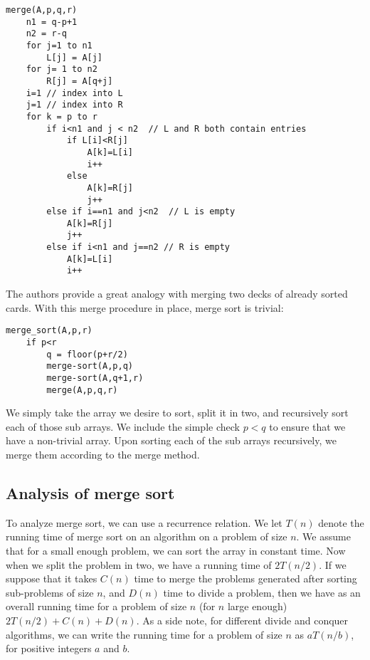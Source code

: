 \documentclass[12pt,english]{article}
\begin{document}
\begin{lstlisting}
merge(A,p,q,r)
	n1 = q-p+1
	n2 = r-q
	for j=1 to n1
		L[j] = A[j]
	for j= 1 to n2
		R[j] = A[q+j]
	i=1 // index into L
	j=1 // index into R
	for k = p to r
		if i<n1 and j < n2  // L and R both contain entries
			if L[i]<R[j] 
				A[k]=L[i]
				i++
			else
				A[k]=R[j]
				j++
		else if i==n1 and j<n2  // L is empty
			A[k]=R[j]
			j++
		else if i<n1 and j==n2 // R is empty
			A[k]=L[i]
			i++
\end{lstlisting}

The authors \cite{CoStRiLe:2001} provide a great analogy with merging two decks of already sorted cards.  With this merge procedure in place, merge sort is trivial:

\begin{lstlisting}
merge_sort(A,p,r)
	if p<r
		q = floor(p+r/2)
		merge-sort(A,p,q)
		merge-sort(A,q+1,r)
		merge(A,p,q,r)
\end{lstlisting}

We simply take the array we desire to sort, split it in two, and recursively sort each of those sub arrays.  We include the simple check $p<q$ to ensure that we have a non-trivial array. Upon sorting each of the sub arrays recursively, we merge them according to the merge method.  

\subsection{Analysis of merge sort}

To analyze merge sort, we can use a recurrence relation.  We let $T(n)$ denote the running time of merge sort on an algorithm on a problem of size $n$.  We assume that for a small enough problem, we can sort the array in constant time.   Now when we split the problem in two, we have a running time of $2T(n/2)$.  If we suppose that it takes $C(n)$ time to merge the problems generated after sorting sub-problems of size $n$, and $D(n)$ time to divide a problem, then we have as an overall running time for a problem of size $n$ (for $n$ large enough) $2T(n/2) + C(n) + D(n)$.  As a side note, for different divide and conquer algorithms, we can write the running time for a problem of size $n$ as $aT(n/b)$, for positive integers $a$ and $b$.
\end{document}
